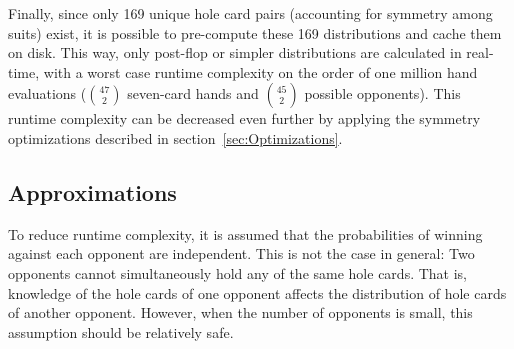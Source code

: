 Finally, since only 169 unique hole card pairs (accounting for symmetry among suits) exist, it is possible to pre-compute these 169 distributions and cache them on disk.
This way, only post-flop or simpler distributions are calculated in real-time, with a worst case runtime complexity on the order of one million hand evaluations ($\binom{47}{2}$ seven-card hands and $\binom{45}{2}$ possible opponents).
This runtime complexity can be decreased even further by applying the symmetry optimizations described in section~\ref{sec:Optimizations}.

\subsection{Approximations}
\label{sec:Approximations}

To reduce runtime complexity, it is assumed that the probabilities of winning against each opponent are independent.
This is not the case in general: Two opponents cannot simultaneously hold any of the same hole cards.
That is, knowledge of the hole cards of one opponent affects the distribution of hole cards of another opponent.
However, when the number of opponents is small, this assumption should be relatively safe.







\clearpage
